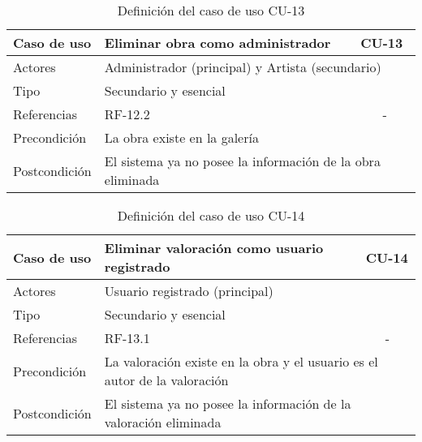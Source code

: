 \begin{table}[H]
    \begin{tabular}{|p{3cm}|p{5cm}|p{2cm}|}
        \hline
        Caso de uso & Eliminar obra como administrador & CU-13 \\
        \hline
        Actores & \multicolumn{2}{|p{7cm}|}{Administrador (principal)
        y Artista (secundario)} \\
        \hline
        Tipo & \multicolumn{2}{|p{7cm}|}{Secundario y esencial} \\
        \hline
        Referencias & RF-12.2 & \multicolumn{1}{|c|}{-} \\
        \hline
        Precondición & \multicolumn{2}{|p{7cm}|}{La obra existe en la galería} \\
        \hline
        Postcondición & \multicolumn{2}{|p{7cm}|}{El sistema ya no posee
        la información de la obra eliminada} \\
        \hline
    \end{tabular}
    \caption{Definición del caso de uso CU-13}
    \label{tab:cu_13}
\end{table}

\begin{table}[H]
    \begin{tabular}{|p{3cm}|p{5cm}|p{2cm}|}
        \hline
        Caso de uso & Eliminar valoración como usuario registrado & CU-14 \\
        \hline
        Actores & \multicolumn{2}{|p{7cm}|}{Usuario registrado (principal)} \\
        \hline
        Tipo & \multicolumn{2}{|p{7cm}|}{Secundario y esencial} \\
        \hline
        Referencias & RF-13.1 & \multicolumn{1}{|c|}{-} \\
        \hline
        Precondición & \multicolumn{2}{|p{7cm}|}{La valoración existe en la obra
        y el usuario es el autor de la valoración} \\
        \hline
        Postcondición & \multicolumn{2}{|p{7cm}|}{El sistema ya no posee
        la información de la valoración eliminada} \\
        \hline
    \end{tabular}
    \caption{Definición del caso de uso CU-14}
    \label{tab:cu_14}
\end{table}

